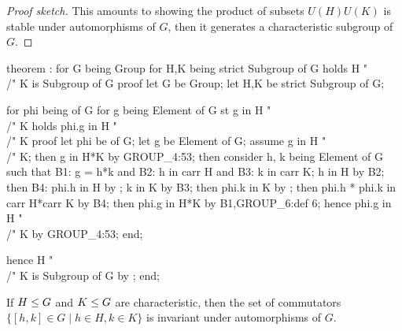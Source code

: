 \begin{proof}[Proof sketch]
This amounts to showing the product of subsets $U(H)U(K)$ is stable
under automorphisms of $G$, then it generates a characteristic subgroup
of $G$.
\end{proof}

\nwenddocs{}\endmoddef\nwstartdeflinemarkup{}\nwenddeflinemarkup
theorem :
  for G being Group
  for H,K being strict  Subgroup of G
  holds H "\\/" K is  Subgroup of G
proof
  let G be Group;
  let H,K be strict  Subgroup of G;

  for phi being  of G
  for g being Element of G st g in H "\\/" K
  holds phi.g in H "\\/" K
  proof
    let phi be  of G;
    let g be Element of G;
    assume g in H "\\/" K;
    then g in H*K by GROUP_4:53;
    then consider h, k being Element of G such that
    B1: g = h*k and
    B2: h in carr H and
    B3: k in carr K;
    h in H by B2;
    then B4: phi.h in H by ;
    k in K by B3;
    then phi.k in K by ;
    then phi.h * phi.k in carr H*carr K by B4;
    then phi.g in H*K by B1,GROUP_6:def 6;
    hence phi.g in H "\\/" K by GROUP_4:53;
  end;

  hence H "\\/" K is  Subgroup of G by ;
end;
\eatline
{}\nwendcode{}\nwdocspar
\begin{theorem}
If $H\leq G$ and $K\leq G$ are characteristic, then the set of
commutators $\{[h,k]\in G\mid h\in H, k\in K\}$ is invariant under
automorphisms of $G$.
\end{theorem}

